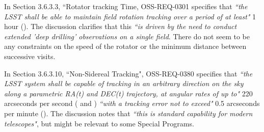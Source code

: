 In Section 3.6.3.3, ``Rotator tracking Time, OSS-REQ-0301 specifies that {\it ``the LSST shall be able to maintain field rotation tracking over a period of at least"} 1 hour ().
The discussion clarifies that this {\it ``is driven by the need to conduct extended 'deep drilling' observations on a single field}.
There do not seem to be any constraints on the speed of the rotator or the minimum distance between successive visits.

In Section 3.6.3.10, ``Non-Sidereal Tracking", OSS-REQ-0380 specifies that {\it ``the LSST system shall be capable of tracking in an arbitrary direction on the sky along a parametric RA(t) and DEC(t) trajectory, at angular rates of up to"} 220 arcseconds per second ( and ) {\it ``with a tracking error not to exceed"} 0.5 arcseconds per minute ().
The discussion notes that {\it ``this is standard capability for modern telescopes"}, but might be relevant to some Special Programs.




